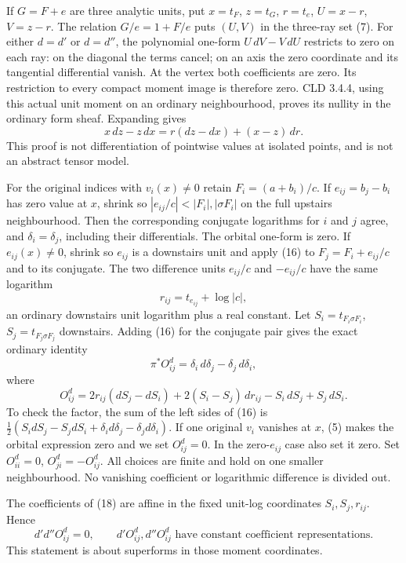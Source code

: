 \documentclass[
  11pt,
]{article}
\begin{document}
If \(G=F+e\) are three analytic units, put \(x=t_F\), \(z=t_G\),
\(r=t_e\), \(U=x-r\), \(V=z-r\). The relation \(G/e=1+F/e\) puts
\((U,V)\) in the three-ray set (7). For either \(d=d'\) or \(d=d''\),
the polynomial one-form \(U\,dV-V\,dU\) restricts to zero on each ray:
on the diagonal the terms cancel; on an axis the zero coordinate and its
tangential differential vanish. At the vertex both coefficients are
zero. Its restriction to every compact moment image is therefore zero.
CLD 3.4.4, using this actual unit moment on an ordinary neighbourhood,
proves its nullity in the ordinary form sheaf. Expanding gives \[
 x\,dz-z\,dx=r(dz-dx)+(x-z)\,dr.                           \tag{16}
\] This proof is not differentiation of pointwise values at isolated
points, and is not an abstract tensor model.

For the original indices with \(v_i(x)\ne0\) retain \(F_i=(a+b_i)/c\).
If \(e_{ij}=b_j-b_i\) has zero value at \(x\), shrink so
\(|e_{ij}/c|<|F_i|,|\sigma F_i|\) on the full upstairs neighbourhood.
Then the corresponding conjugate logarithms for \(i\) and \(j\) agree,
and \(\delta_i=\delta_j\), including their differentials. The orbital
one-form is zero. If \(e_{ij}(x)\ne0\), shrink so \(e_{ij}\) is a
downstairs unit and apply (16) to \(F_j=F_i+e_{ij}/c\) and to its
conjugate. The two difference units \(e_{ij}/c\) and \(-e_{ij}/c\) have
the same logarithm \[
 r_{ij}=t_{e_{ij}}+\log|c|,
\] an ordinary downstairs unit logarithm plus a real constant. Let
\(S_i=t_{F_i\sigma F_i}\), \(S_j=t_{F_j\sigma F_j}\) downstairs. Adding
(16) for the conjugate pair gives the exact ordinary identity \[
 \pi^*O_{ij}^{d}=\delta_i\,d\delta_j-\delta_j\,d\delta_i,
                                                                    \tag{17}
\] where \[
 O_{ij}^{d}=2r_{ij}(dS_j-dS_i)+2(S_i-S_j)\,dr_{ij}
                         -S_i\,dS_j+S_j\,dS_i.             \tag{18}
\] To check the factor, the sum of the left sides of (16) is
\(\tfrac12(S_i dS_j-S_j dS_i+
\delta_i d\delta_j-\delta_j d\delta_i)\). If one original \(v_i\)
vanishes at \(x\), (5) makes the orbital expression zero and we set
\(O_{ij}^d=0\). In the zero-\(e_{ij}\) case also set it zero. Set
\(O_{ii}^d=0\), \(O_{ji}^d=-O_{ij}^d\). All choices are finite and hold
on one smaller neighbourhood. No vanishing coefficient or logarithmic
difference is divided out.

The coefficients of (18) are affine in the fixed unit-log coordinates
\(S_i,S_j,r_{ij}\). Hence \[
 d'd''O_{ij}^{d}=0,\qquad d'O_{ij}^{d},d''O_{ij}^{d}
        \text{ have constant coefficient representations}.          \tag{19}
\] This statement is about superforms in those moment coordinates.
\end{document}
